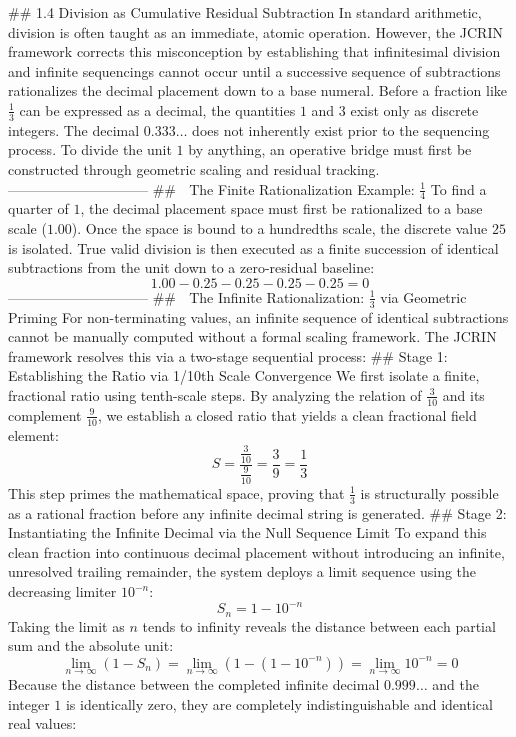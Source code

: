 ## 1.4 Division as Cumulative Residual Subtraction
In standard arithmetic, division is often taught as an immediate, atomic operation. However, the JCRIN framework corrects this misconception by establishing that infinitesimal division and infinite sequencings cannot occur until a successive sequence of subtractions rationalizes the decimal placement down to a base numeral.
Before a fraction like $\frac{1}{3}$ can be expressed as a decimal, the quantities $1$ and $3$ exist only as discrete integers. The decimal $0.333\dots$ does not inherently exist prior to the sequencing process. To divide the unit $1$ by anything, an operative bridge must first be constructed through geometric scaling and residual tracking.
------------------------------
## 🧱 The Finite Rationalization Example: $\frac{1}{4}$
To find a quarter of $1$, the decimal placement space must first be rationalized to a base scale ($1.00$). Once the space is bound to a hundredths scale, the discrete value $25$ is isolated. True valid division is then executed as a finite succession of identical subtractions from the unit down to a zero-residual baseline:
$$1.00 - 0.25 - 0.25 - 0.25 - 0.25 = 0$$ 
------------------------------
## 🔄 The Infinite Rationalization: $\frac{1}{3}$ via Geometric Priming
For non-terminating values, an infinite sequence of identical subtractions cannot be manually computed without a formal scaling framework. The JCRIN framework resolves this via a two-stage sequential process:
## Stage 1: Establishing the Ratio via 1/10th Scale Convergence
We first isolate a finite, fractional ratio using tenth-scale steps. By analyzing the relation of $\frac{3}{10}$ and its complement $\frac{9}{10}$, we establish a closed ratio that yields a clean fractional field element:
$$S = \frac{\frac{3}{10}}{\frac{9}{10}} = \frac{3}{9} = \frac{1}{3}$$ 
This step primes the mathematical space, proving that $\frac{1}{3}$ is structurally possible as a rational fraction before any infinite decimal string is generated.
## Stage 2: Instantiating the Infinite Decimal via the Null Sequence Limit
To expand this clean fraction into continuous decimal placement without introducing an infinite, unresolved trailing remainder, the system deploys a limit sequence using the decreasing limiter $10^{-n}$:
$$S_n = 1 - 10^{-n}$$ 
Taking the limit as $n$ tends to infinity reveals the distance between each partial sum and the absolute unit:
$$\lim_{n \to \infty} (1 - S_n) = \lim_{n \to \infty} \left(1 - (1 - 10^{-n})\right) = \lim_{n \to \infty} 10^{-n} = 0$$ 
Because the distance between the completed infinite decimal $0.999\dots$ and the integer $1$ is identically zero, they are completely indistinguishable and identical real values:
